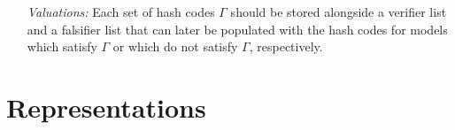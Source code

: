 \documentclass[a4paper, 11pt]{article} %
\newcommand{\tuple}[1]{\langle#1\rangle} %
\newcommand{\set}[1]{\lbrace#1\rbrace} %
\begin{document}
\begin{enumerate}
  \item[\it Valuations:] Each set of hash codes $\Gamma$ should be stored alongside a verifier list and a falsifier list that can later be populated with the hash codes for models which satisfy $\Gamma$ or which do not satisfy $\Gamma$, respectively. 
\end{enumerate}







\section{Representations}
\end{document}
